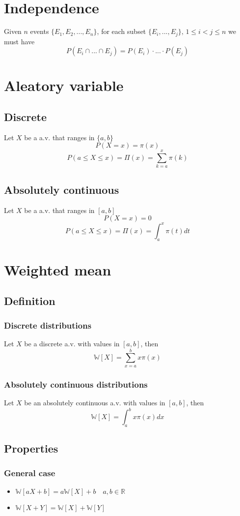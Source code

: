 \documentclass[12pt]{article}
\begin{document}
\section{Independence}
Given $n$ events $\{E_1,E_2,...,E_n\}$, for each subset $\{E_i,...,E_j\},\,1\leq i < j\leq n$ we must have $$P(E_i\cap ...\cap E_j)=P(E_i)\cdot ... \cdot P(E_j)$$
\clearpage
\section{Aleatory variable}
\subsection{Discrete}
Let $X$ be a a.v. that ranges in $\{a,b\}$
$$P(X=x)=\pi(x)$$
$$P(a\leq X\leq x)=\Pi(x)=\sum_{k=a}^{x}\pi(k)$$
\subsection{Absolutely continuous}
Let $X$ be a a.v. that ranges in $[a,b]$
$$P(X=x)=0$$
$$P(a\leq X\leq x)=\Pi(x)=\int_a^{x}\pi(t)dt$$

\clearpage

\section{Weighted mean}
\subsection{Definition}
\subsubsection{Discrete distributions}
Let $X$ be a discrete a.v. with values in $[a,b]$, then
$$\mathbb{W}[X]=\sum_{x=a}^bx\pi(x)$$
\subsubsection{Absolutely continuous distributions}
Let $X$ be an absolutely continuous a.v. with values in $[a,b]$, then
$$\mathbb{W}[X]=\int_{a}^bx\pi(x)dx$$
\subsection{Properties}
\subsubsection{General case}
\begin{itemize}
	\item $\mathbb{W}[aX+b]=a\mathbb{W}[X]+b\quad a,b\in \mathbb{R}$
	\item $\mathbb{W}[X+Y]=\mathbb{W}[X]+\mathbb{W}[Y]$
\end{itemize}
\end{document}
